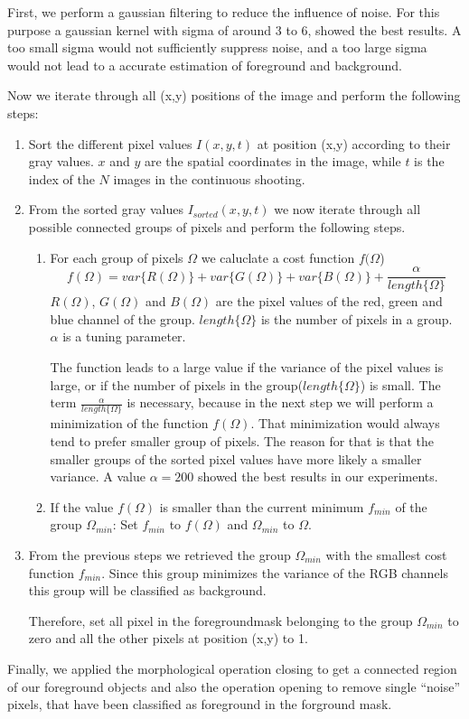 First, we perform a gaussian filtering to reduce the influence of noise. For this purpose a
gaussian kernel with sigma of around 3 to 6, showed the best results.
A too small sigma would not sufficiently suppress noise,
and a too large sigma would not lead to a accurate estimation of foreground and background.

Now we iterate through all (x,y) positions of the image and perform the following steps:

\begin{enumerate}
 \item Sort the different pixel values $I(x,y,t)$ at position (x,y) according to their gray values.
 $x$ and $y$ are the spatial coordinates in the image, while $t$ is the index of the $N$ images in the
 continuous shooting.
 \item From the sorted gray values $I_{sorted}(x,y,t)$ we now iterate through all
 possible connected groups of pixels and perform the following steps.
 \begin{enumerate}
  \item For each group of pixels $\Omega$ we caluclate a cost function $f(\Omega$)
  $$
  f(\Omega) = var\{R(\Omega)\} + var\{G(\Omega)\} + var\{B(\Omega)\} + \frac{\alpha}{length\{\Omega\}}
  $$
  $R(\Omega)$, $G(\Omega)$ and $B(\Omega)$ are the pixel values of the red, green and blue channel
  of the group. $length\{\Omega\}$ is the number of pixels in a group. $\alpha$ is a tuning parameter.
  
  The function leads to a large value if the variance of the pixel values is large, or if the 
  number of pixels in the group($length\{\Omega\}$) is small. The term $\frac{\alpha}{length\{\Omega\}}$
  is necessary, because in the next step we will perform a minimization of the function $f(\Omega)$.
  That minimization would always tend to prefer smaller group of pixels. 
  The reason for that is that the smaller groups of the sorted pixel values
  have more likely a smaller variance. A value $\alpha=200$ showed the best results in our experiments.
  \item If the value $f(\Omega)$ is smaller than the current minimum $f_{min}$ of the group $\Omega_{min}$:
  Set $f_{min}$ to $f(\Omega)$ and $\Omega_{min}$ to $\Omega$.
 \end{enumerate}
 \item From the previous steps we retrieved the group $\Omega_{min}$ with the smallest cost function
 $f_{min}$. Since this group minimizes the variance of the RGB channels this group will be classified as
 background.
 
 Therefore, set all pixel in the foregroundmask belonging to the group $\Omega_{min}$ to zero and
 all the other pixels at position (x,y) to 1.

\end{enumerate}

Finally, we applied the morphological operation closing to get a connected region
of our foreground objects and also the operation opening to remove single ``noise'' pixels, that have been
classified as foreground in the forground mask.


